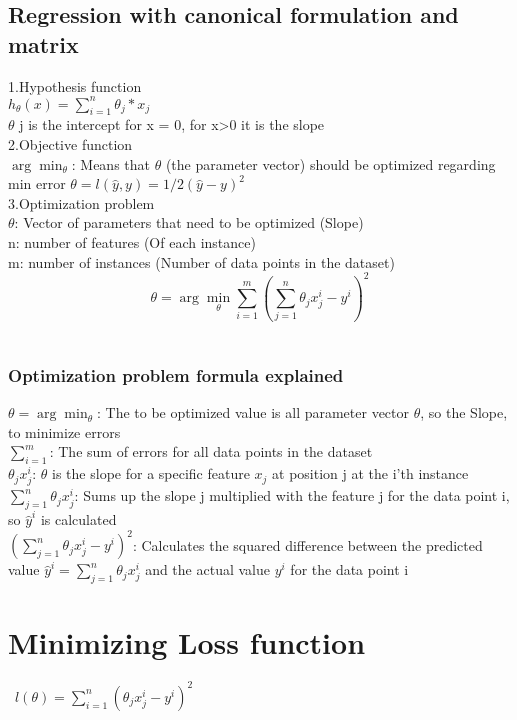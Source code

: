 \documentclass{article}
\begin{document}
\subsection{Regression with canonical formulation and matrix}
1.Hypothesis function \\ 
$h_\theta(x) = \sum_{i=1}^{n} \theta_j * x_j$ \\
$\theta$ j is the intercept for x = 0, for x>0 it is the slope \\
2.Objective function \\
$\arg\min_{\theta}$: Means that $ \theta$ (the parameter vector) should be optimized regarding min error
$  \theta = l(\hat{y}, y) =  1/2 (\hat{y}-y)^2$ \\ 
3.Optimization problem \\
$\theta$: Vector of parameters that need to be optimized (Slope) \\
n: number of features (Of each instance) \\ 
m: number of instances (Number of data points in the dataset) \\

\[
\theta = \arg\min_{\theta} \sum_{i=1}^{m} \left( \sum_{j=1}^{n} \theta_j x_j^i - y^i \right)^2
\] \\ 
\subsubsection{Optimization problem formula explained}
$\theta = \arg\min_{\theta}$: The to be optimized value is all parameter vector $\theta$, so the Slope, to minimize errors\\
$\sum_{i=1}^{m}$: The sum of errors for all data points in the dataset \\ 
$\theta_j x_j^i$: $\theta$ is the slope for a specific feature $x_j$ at position j at the i'th instance \\ 
$\sum_{j=1}^{n}\theta_j x_j^i$: Sums up the slope j multiplied with the feature j for the data point i, so $\hat{y}^i$ is calculated\\ 
$( \sum_{j=1}^{n} \theta_j x_j^i - y^i)^2$: Calculates the squared difference between the predicted value $\hat{y}^i = \sum_{j=1}^{n}\theta_j x_j^i$ and the actual value $y^i$ for the data point i

\section{Minimizing Loss function}\
$l(\theta ) = \sum_{i=1}^{n} (\theta_j x_j^i - y^i)^2$
\end{document}
